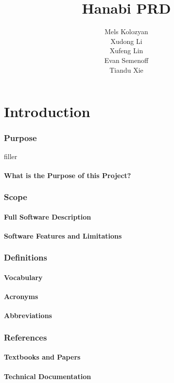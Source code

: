 \documentclass[11pt]{article}
\title{\textbf{Hanabi PRD}}
\author{Mels Kolozyan\\
		Xudong Li\\
		Xufeng Lin\\
		Evan Semenoff\\
		Tiandu Xie\\
		}
\date{}
\begin{document}
\maketitle
\newpage
\tableofcontents
\newpage
\part{Introduction}
\section{Purpose}
filler
\subsection{What is the Purpose of this Project?}
\section{Scope}
\subsection{Full Software Description}
\subsection{Software Features and Limitations}
\section{Definitions}
\subsection{Vocabulary}
\subsection{Acronyms}
\subsection{Abbreviations}
\section{References}
\subsection{Textbooks and Papers}
\subsection{Technical Documentation}
\end{document}
